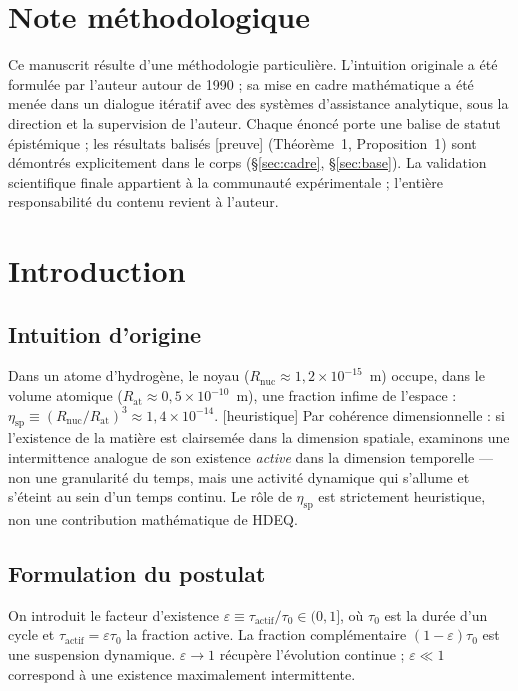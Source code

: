 \documentclass[11pt,a4paper]{article}
\newcommand{\statut}[1]{{\footnotesize\textsf{[#1]}}}
\theoremstyle{plain}
\theoremstyle{definition}
\theoremstyle{remark}
\begin{document}
\section{Note m\'ethodologique}
Ce manuscrit r\'esulte d'une m\'ethodologie particuli\`ere. L'intuition originale a \'et\'e
formul\'ee par l'auteur autour de 1990 ; sa mise en cadre math\'ematique a \'et\'e men\'ee
dans un dialogue it\'eratif avec des syst\`emes d'assistance analytique, sous la
direction et la supervision de l'auteur. Chaque \'enonc\'e porte une balise de statut
\'epist\'emique ; les r\'esultats balis\'es \statut{preuve} (Th\'eor\`eme~1, Proposition~1)
sont d\'emontr\'es explicitement dans le corps (\S\ref{sec:cadre}, \S\ref{sec:base}). La
validation scientifique finale appartient \`a la communaut\'e exp\'erimentale ; l'enti\`ere
responsabilit\'e du contenu revient \`a l'auteur.

\section{Introduction}
\subsection{Intuition d'origine}
Dans un atome d'hydrog\`ene, le noyau ($R_{\mathrm{nuc}}\approx1{,}2\times10^{-15}$~m)
occupe, dans le volume atomique ($R_{\mathrm{at}}\approx0{,}5\times10^{-10}$~m), une
fraction infime de l'espace : $\eta_{\mathrm{sp}}\equiv(R_{\mathrm{nuc}}/R_{\mathrm{at}})^3
\approx1{,}4\times10^{-14}$. \statut{heuristique} Par coh\'erence dimensionnelle :
si l'existence de la mati\`ere est clairsem\'ee dans la dimension spatiale, examinons
une intermittence analogue de son existence \emph{active} dans la dimension
temporelle --- non une granularit\'e du temps, mais une activit\'e dynamique qui
s'allume et s'\'eteint au sein d'un temps continu. Le r\^ole de $\eta_{\mathrm{sp}}$
est strictement heuristique, non une contribution math\'ematique de HDEQ.

\subsection{Formulation du postulat}
On introduit le facteur d'existence $\varepsilon\equiv\tau_{\mathrm{actif}}/\tau_0\in(0,1]$,
o\`u $\tau_0$ est la dur\'ee d'un cycle et $\tau_{\mathrm{actif}}=\varepsilon\tau_0$ la
fraction active. La fraction compl\'ementaire $(1-\varepsilon)\tau_0$ est une suspension
dynamique. $\varepsilon\to1$ r\'ecup\`ere l'\'evolution continue ; $\varepsilon\ll1$
correspond \`a une existence maximalement intermittente.
\end{document}
